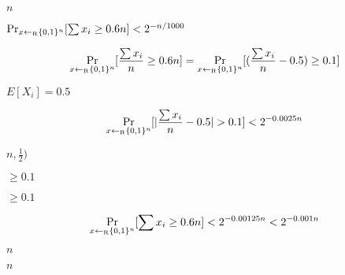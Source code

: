\documentclass[10pt]{book}
\begin{document}
\begin{mdSnippets}
\begin{mdInlineSnippet}[7b8b965ad4bca0e41ab51de7b31363a1]%
$n$\end{mdInlineSnippet}%
\begin{mdInlineSnippet}[879f2a1679fb96a40310a35e9ab0712e]%
$\Pr_{x\leftarrow_{\text{\tiny R}} \{0,1\}^n} [ \sum x_i \geq 0.6n ] < 2^{-n/1000}$\end{mdInlineSnippet}%
\begin{mdDisplaySnippet}[1a9c87322d490e7d445bf0785abc3318]%
\[%
\Pr_{x \getsr \zo^n} [\frac{\sum x_i}{n} \geq 0.6n] = \Pr_{x \getsr \zo^n} [(\frac{\sum x_i}{n} - 0.5) \geq 0.1]
\]%
\end{mdDisplaySnippet}%
\begin{mdInlineSnippet}[6db8568201ff7efb8a2048d61d6a2b41]%
$E[X_i] = 0.5$\end{mdInlineSnippet}%
\begin{mdDisplaySnippet}[ee67ee9e3f22f652df9c1b040a36bd4c]%
\[%
\Pr_{x \getsr \zo^n} [|\frac{\sum x_i}{n} - 0.5| > 0.1 ] < 2^{-0.0025n}
\]%
\end{mdDisplaySnippet}%
\begin{mdInlineSnippet}%
$n,\frac{1}{2})$\end{mdInlineSnippet}%
\begin{mdInlineSnippet}[6a625762594bbc46297851318b26042c]%
$\geq 0.1$\end{mdInlineSnippet}%
\begin{mdInlineSnippet}[6a625762594bbc46297851318b26042c]%
$\geq 0.1$\end{mdInlineSnippet}%
\begin{mdDisplaySnippet}%
\[%
\Pr_{x \getsr \zo^n} [\sum x_i \geq 0.6n] < 2^{-0.00125n} < 2^{-0.001n} 
\]%
\end{mdDisplaySnippet}%
\begin{mdInlineSnippet}[7b8b965ad4bca0e41ab51de7b31363a1]%
$n$\end{mdInlineSnippet}%
\begin{mdInlineSnippet}[7b8b965ad4bca0e41ab51de7b31363a1]%
$n$\end{mdInlineSnippet}%
\begin{mdDisplaySnippet}[3ff989622f37a31ee130f8150a68a513]%

\end{mdDisplaySnippet}
\end{mdSnippets}
\end{document}
